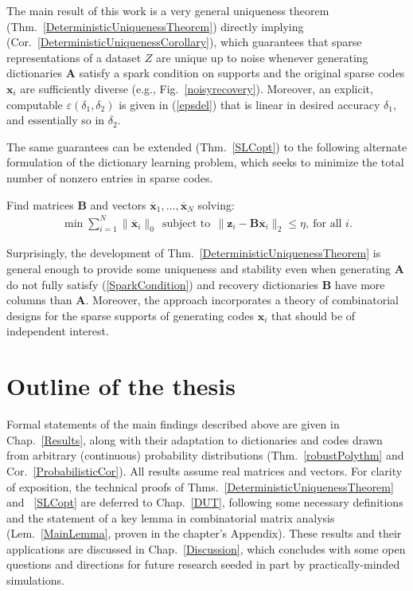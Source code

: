 The main result of this work is a very general uniqueness theorem (Thm.~\ref{DeterministicUniquenessTheorem}) directly 
implying (Cor.~\ref{DeterministicUniquenessCorollary}), which guarantees that sparse representations of a dataset $Z$ are unique up to noise whenever generating dictionaries $\mathbf{A}$ satisfy a spark condition on supports and the original sparse codes $\mathbf{x}_i$ are sufficiently diverse (e.g., Fig.~\ref{noisyrecovery}).  Moreover, an explicit, computable $\varepsilon(\delta_1, \delta_2)$ is given in (\ref{epsdel}) that is linear in desired accuracy $\delta_1$, and essentially so in $\delta_2$.

The same guarantees can be extended (Thm.~\ref{SLCopt}) to the following alternate formulation of the dictionary learning problem, which seeks to minimize the total number of nonzero entries in sparse codes.

\begin{problem}\label{OptimizationProblem}
Find matrices $\mathbf{B}$ and vectors \mbox{$\mathbf{\overline x}_1, \ldots, \mathbf{\overline x}_N$} solving:
\begin{align}\label{minsum}
\min \sum_{i = 1}^N \|\mathbf{\overline x}_{i}\|_0 \ \
\text{subject to} \ \ \|\mathbf{z}_i - \mathbf{B}\mathbf{\overline x}_i\|_2 \leq \eta, \ \text{for all $i$}.
\end{align}
\end{problem}

Surprisingly, the development of Thm.~\ref{DeterministicUniquenessTheorem} is general enough to provide some uniqueness and stability even when generating $\mathbf{A}$ do not fully satisfy (\ref{SparkCondition}) and recovery dictionaries $\mathbf{B}$ have more columns than $\mathbf{A}$.  Moreover, the approach incorporates a theory of combinatorial designs for the sparse supports of generating codes $\mathbf{x}_i$ that should be of independent interest. 

\section{Outline of the thesis}

Formal statements of the main findings described above are given in Chap.~\ref{Results}, along with their adaptation to dictionaries and codes drawn from arbitrary (continuous) probability distributions (Thm.~\ref{robustPolythm} and Cor.~\ref{ProbabilisticCor}). All results assume real matrices and vectors. For clarity of exposition, the technical proofs of Thms.~\ref{DeterministicUniquenessTheorem} and ~\ref{SLCopt} are deferred to Chap.~\ref{DUT}, following some necessary definitions and the statement of a key lemma in combinatorial matrix analysis (Lem.~\ref{MainLemma}, proven in the chapter's Appendix). These results and their applications are discussed in Chap.~\ref{Discussion}, which concludes with some open questions and directions for future research seeded in part by practically-minded simulations. 
